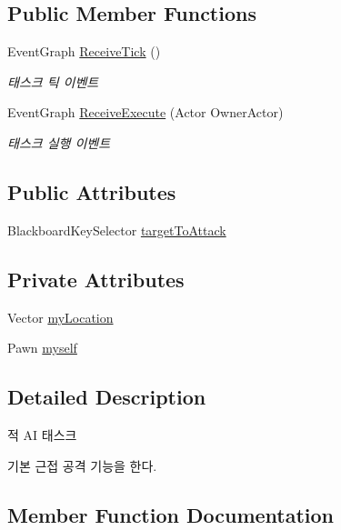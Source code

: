 \subsection*{Public Member Functions}
\begin{DoxyCompactItemize}
\item 
Event\+Graph \hyperlink{class_enemy_attack___b_t_task_ace9bb26b7392400fac4a24c736b16116}{Receive\+Tick} ()
\begin{DoxyCompactList}\small\item\em 태스크 틱 이벤트 \end{DoxyCompactList}\item 
Event\+Graph \hyperlink{class_enemy_attack___b_t_task_afbbed53ded3752395a71bf1c86d830d2}{Receive\+Execute} (Actor Owner\+Actor)
\begin{DoxyCompactList}\small\item\em 태스크 실행 이벤트 \end{DoxyCompactList}\end{DoxyCompactItemize}
\subsection*{Public Attributes}
\begin{DoxyCompactItemize}
\item 
Blackboard\+Key\+Selector \hyperlink{class_enemy_attack___b_t_task_a3e66ecf42db2caaa36b45cc0b6116062}{target\+To\+Attack}
\end{DoxyCompactItemize}
\subsection*{Private Attributes}
\begin{DoxyCompactItemize}
\item 
Vector \hyperlink{class_enemy_attack___b_t_task_ab57521e6c6d827822ff6be4f5947e912}{my\+Location}
\item 
Pawn \hyperlink{class_enemy_attack___b_t_task_a547169bbc795a0fc6e6e12601c40cc47}{myself}
\end{DoxyCompactItemize}


\subsection{Detailed Description}
적 AI 태스크 

기본 근접 공격 기능을 한다. 

\subsection{Member Function Documentation}

